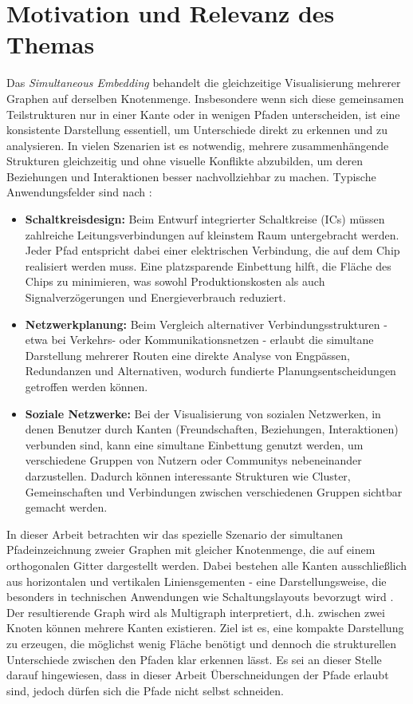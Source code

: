 \documentclass[bachelor, german]{algothesis}
\begin{document}
\section{Motivation und Relevanz des Themas}
Das \emph{Simultaneous Embedding} behandelt die gleichzeitige Visualisierung mehrerer Graphen auf derselben Knotenmenge. Insbesondere wenn sich diese gemeinsamen Teilstrukturen nur in einer Kante oder in wenigen Pfaden unterscheiden, ist eine konsistente Darstellung essentiell, um Unterschiede direkt zu erkennen und zu analysieren. In vielen Szenarien ist es notwendig, mehrere zusammenhängende Strukturen gleichzeitig und ohne visuelle Konflikte abzubilden, um deren Beziehungen und Interaktionen besser nachvollziehbar zu machen. Typische Anwendungsfelder sind nach \cite{Handbook}:
\begin{itemize}
  \item \textbf{Schaltkreisdesign:} Beim Entwurf integrierter Schaltkreise (ICs) müssen zahlreiche Leitungsverbindungen auf kleinstem Raum untergebracht werden. Jeder Pfad entspricht dabei einer elektrischen Verbindung, die auf dem Chip realisiert werden muss. Eine platzsparende Einbettung hilft, die Fläche des Chips zu minimieren, was sowohl Produktionskosten als auch Signalverzögerungen und Energieverbrauch reduziert.
  \item \textbf{Netzwerkplanung:} Beim Vergleich alternativer Verbindungsstrukturen - etwa bei Verkehrs- oder Kommunikationsnetzen - erlaubt die simultane Darstellung mehrerer Routen eine direkte Analyse von Engpässen, Redundanzen und Alternativen, wodurch fundierte Planungsentscheidungen getroffen werden können.
  \item \textbf{Soziale Netzwerke:} Bei der Visualisierung von sozialen Netzwerken, in denen Benutzer durch Kanten (Freundschaften, Beziehungen, Interaktionen) verbunden sind, kann eine simultane Einbettung genutzt werden, um verschiedene Gruppen von Nutzern oder Communitys nebeneinander darzustellen. Dadurch können interessante Strukturen wie Cluster, Gemeinschaften und Verbindungen zwischen verschiedenen Gruppen sichtbar gemacht werden.
\end{itemize}
In dieser Arbeit betrachten wir das spezielle Szenario der simultanen Pfadeinzeichnung zweier Graphen mit gleicher Knotenmenge, die auf einem orthogonalen Gitter dargestellt werden. Dabei bestehen alle Kanten ausschließlich aus horizontalen und vertikalen Liniensgementen - eine Darstellungsweise, die besonders in technischen Anwendungen wie Schaltungslayouts bevorzugt wird \cite{Takao}. Der resultierende Graph wird als Multigraph interpretiert, d.h. zwischen zwei Knoten können mehrere Kanten existieren. Ziel ist es, eine kompakte Darstellung zu erzeugen, die möglichst wenig Fläche benötigt und dennoch die strukturellen Unterschiede zwischen den Pfaden klar erkennen lässt. Es sei an dieser Stelle darauf hingewiesen, dass in dieser Arbeit Überschneidungen der Pfade erlaubt sind, jedoch dürfen sich die Pfade nicht selbst schneiden.
\end{document}
